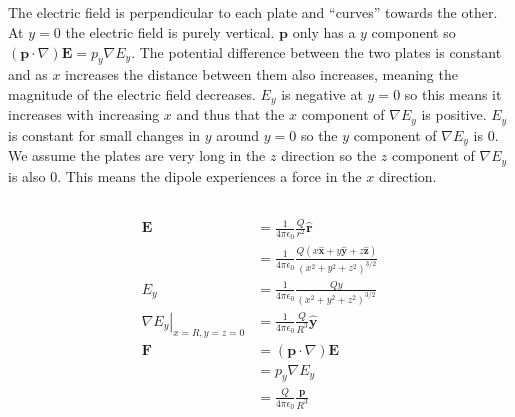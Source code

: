 \documentclass{article}
\renewcommand{\vec}[1]{\boldsymbol{\mathbf{#1}}}
\newcommand{\uvec}[1]{\hat{\vec{#1}}}
\newcommand{\ke}{\frac{1}{4 \pi \epsilon_0}}
\begin{document}
\subsection{}

The electric field is perpendicular to each plate and ``curves'' towards the other. At $y = 0$ the electric field is purely vertical. $\vec{p}$ only has a $y$ component so $(\vec{p} \cdot \nabla) \vec{E} = p_y \nabla E_y$. The potential difference between the two plates is constant and as $x$ increases the distance between them also increases, meaning the magnitude of the electric field decreases. $E_y$ is negative at $y = 0$ so this means it increases with increasing $x$ and thus that the $x$ component of $\nabla E_y$ is positive. $E_y$ is constant for small changes in $y$ around $y = 0$ so the $y$ component of $\nabla E_y$ is $0$. We assume the plates are very long in the $z$ direction so the $z$ component of $\nabla E_y$ is also $0$. This means the dipole experiences a force in the $x$ direction.

\subsection{}

\begin{align*}
  \vec{E}                                      & = \ke \frac{Q}{r^2} \uvec{r}                                                     \\
                                               & = \ke \frac{Q (x \uvec{x} + y \uvec{y} + z \uvec{z})}{(x^2 + y^2 + z^2)^{3 / 2}} \\
  E_y                                          & = \ke \frac{Q y}{(x^2 + y^2 + z^2)^{3 / 2}}                                      \\
  \left. \nabla E_y \right|_{x = R, y = z = 0} & = \ke \frac{Q}{R^3} \uvec{y}                                                     \\
  \vec{F}                                      & = (\vec{p} \cdot \nabla) \vec{E}                                                 \\
                                               & = p_y \nabla E_y                                                                 \\
                                               & = \frac{Q}{4 \pi \epsilon_0} \frac{\vec{p}}{R^3}
\end{align*}

\subsection{}
\end{document}
